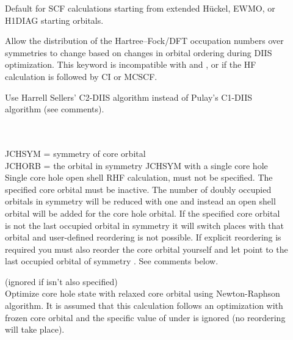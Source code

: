 \begin{description}
\item[]
  Default for SCF calculations starting from extended H\"{u}ckel, EWMO, or H1DIAG
  starting orbitals.

  Allow the distribution of the Hartree--Fock/DFT occupation numbers over
  symmetries to
  change based on changes in orbital ordering during DIIS optimization.
  This keyword is incompatible with  and , or
  if the HF calculation is followed by CI or MCSCF.


\item[]
  Use Harrell Sellers' C2-DIIS algorithm instead of Pulay's C1-DIIS algorithm
  (see comments).

\item[] \ \\
   \\
  JCHSYM = symmetry of core orbital\\
  JCHORB = the orbital in symmetry JCHSYM with a single core hole\\
  Single core hole open shell RHF calculation,  must not
  be specified.  The specified core orbital must be
  inactive.
  The number of doubly occupied orbitals in symmetry  will be reduced with one
  and instead an open shell orbital will be added for the core hole orbital.
  If the specified core orbital is not the last occupied orbital in symmetry
   it will switch places with that orbital and user-defined reordering
  is not possible.
  If explicit reordering is required you must also reorder
  the core orbital yourself and let  point to the last occupied orbital
  of symmetry .  See comments below.

\item[]
  (ignored if  isn't also specified)\\
  Optimize core hole state with relaxed
  core orbital using Newton-Raphson algorithm.
  It is assumed that this calculation follows an optimization
  with frozen core orbital and the specific value of
   under  is ignored (no
  reordering will take place).


\end{description}
